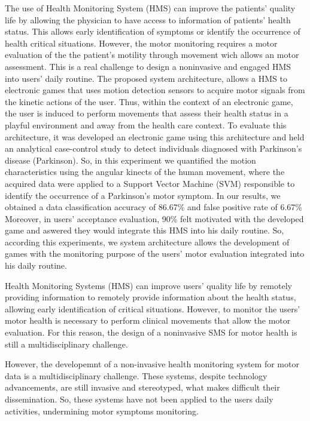 The use of Health Monitoring System (HMS) can improve the patients' quality life by allowing the physician to have access to information of patients' health status. This allows early identification of symptoms or identify the occurrence of health critical situations. However, the motor monitoring requires a motor evaluation of the the patient's motility through movement wich allows an motor assessment. This is a real challenge to design a noninvasive and engaged HMS into users' daily routine.
The proposed system architecture, allows a HMS to electronic games that uses motion detection sensors to acquire motor signals from the kinetic actions of the user. Thus, within the context of an electronic game, the user is induced to perform movements that assess their health status in a playful environment and away from the health care context. To evaluate this architecture, it was developed an electronic game using this architecture and held an analytical case-control study to detect individuals diagnosed with Parkinson's disease (Parkinson). So, in this experiment we quantified the motion characteristics using the angular kinects of the human movement, where the acquired data were applied to a Support Vector Machine (SVM) responsible to identify the occurrence of a Parkinson's motor symptom. In our results, we obtained a data classification accuracy of 86.67\% and false positive rate of 6.67\% Moreover, in users' acceptance evaluation, 90\% felt motivated with the developed game and 
aswered they would integrate this HMS into his daily routine. So, according this experiments, we system architecture allows the development of games with the monitoring purpose of the users' motor evaluation integrated into his daily routine.




Health Monitoring Systems (HMS) can improve users' quality life by remotely providing information to remotely provide information about the health status, allowing early identification of critical situations. However, to monitor the users' motor health is necessary to perform clinical movements that allow the motor evaluation. For this reason, the design of a noninvasive SMS for motor health is still a multidisciplinary challenge.


However, the developemnt of a non-invasive health monitoring system for motor data is a multidisciplinary challenge. These systems, despite technology advancements, are still invasive and stereotyped, what makes difficult their dissemination. So, these systems have not been applied to the users daily activities, undermining motor symptoms monitoring.

